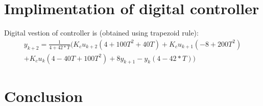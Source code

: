 \documentclass[a4paper,12pt,oneside]{article}
\begin{document}
\section{Implimentation of digital controller}
Digital vestion of controller is (obtained using trapezoid rule):
\begin{multline}
y_{k+2} = \frac{1}{4 + 42 * T} (K_cu_{k+2}(4 + 100T^2 + 40T) + K_cu_{k+1}(-8 + 200T^2) \\+ K_cu_{k}(4 - 40T + 100T^2) + 8y_{k+1} - y_{k}(4 - 42*T))
\end{multline}

\section{Conclusion}
\end{document}
